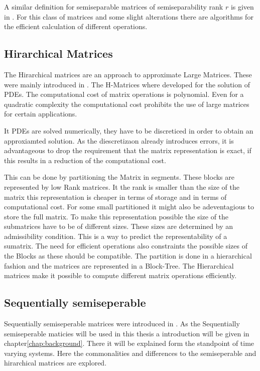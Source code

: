 \documentclass[doctype=mastersthesis,BCOR=15mm,biblatex]{ldvbook}%
\begin{document}
A similar definition for semiseparable matrices of semiseparability rank $r$ is given in \cite{vandebril_bibliography_2005}.
For this class of matrices and some slight alterations there are algorithms for the efficient calculation of different operations.

\subsection{Hirarchical Matrices}
The Hirarchical matrices are an approach to approximate Large Matrices. These were mainly introduced in \cite{grasedyck_theorie_2001,hackbusch_hierarchische_2009}.
The H-Matrices where developed for the solution of PDEs.
The computational cost of matrix operations is polynomial. Even for a quadratic complexity the computational cost prohibits the use of large matrices for certain applications.

It PDEs are solved numerically, they have to be discreticed in order to obtain an approxiamted solution.
As the diescretizaon already introduces errors, it is advantageous to drop the requirement that the matrix representation is exact, if this results in a reduction of the computational cost.

This can be done by partitioning the Matrix in segments. These blocks are represented by low Rank matrices. It the rank is smaller than the size of the matrix this representation is cheaper in terms of storage and in terms of computational cost.
For some small partitioned it might also be adeventagious to store the full matrix.
To make this representation possible the size of the submatrices have to be of different sizes.
These sizes are determined by an admissibility condition. This is a way to predict the representability of a sumatrix. 
The need for efficient operations also constraints the possible sizes of the Blocks as these should be compatible.
The partition is done in a hierarchical fashion and the matrices are represented in a Block-Tree.
The Hierarchical matrices make it possible to compute different matrix operations efficiently.

\subsection{Sequentially semiseperable}
Sequentially semiseperable matrices were introduced in \cite{dewilde_time-varying_1998}.
As the Sequentially semiseperable maticies will be used in this thesis a introduction will be given in chapter\ref{chap:background}. 
There it will be explained form the standpoint of time varying systems.
Here the commonalities and differences to the semiseperable and hirarchical matrices are explored.
\end{document}
